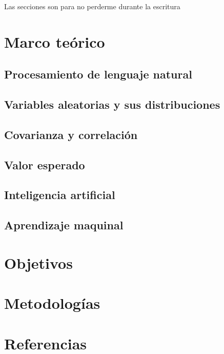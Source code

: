 \documentclass[12pt,letterpaper]{article}
\begin{document}
\maketitle
%
\tableofcontents
\pagebreak
Las secciones son para no perderme durante la escritura
\section {Marco teórico}\label{sec:marco}

\subsection {Procesamiento de lenguaje natural}\label{subsec:nlp}
\subsection {Variables aleatorias y sus distribuciones}\label{subsec:vayd}
\subsection {Covarianza y correlación}\label{subsec:reg1}
\subsection {Valor esperado}\label{subsec:valesp}
\subsection {Inteligencia artificial}\label{subsec:intela}
\subsection {Aprendizaje maquinal}\label{subsec:machinel}
\section {Objetivos}\label{sec:objetivos}
\section {Metodologías}\label{sec:metod}
\section {Referencias}\label{sec:refs}
\printbibliography[heading=none]
\end{document}
